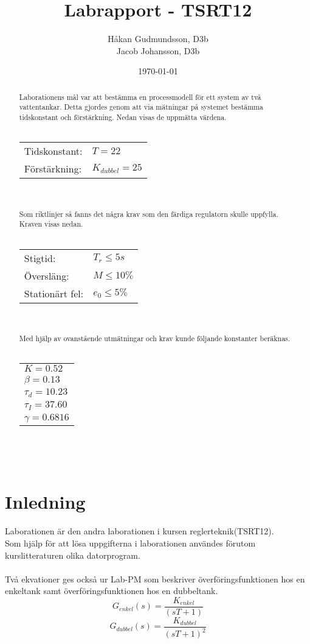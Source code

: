 \documentclass[a4paper]{article}
\title{Labrapport - TSRT12}
\author{Håkan Gudmundsson, D3b \\ Jacob Johansson, D3b}
\date{\today}
\begin{document}
\maketitle
\newpage

\begin{abstract}

Laborationens mål var att bestämma en processmodell för ett system av två vattentankar.
Detta gjordes genom att via mätningar på systemet bestämma tidskonstant och förstärkning.
Nedan visas de uppmätta värdena.
\\\\
\begin{tabular}{l l}
  Tidskonstant: & $T = 22$ \\
  Förstärkning: & $K_{dubbel} = 25$ 
\end{tabular}
\\\\
Som riktlinjer så fanns det några krav som den färdiga regulatorn skulle uppfylla.
Kraven visas nedan.
\\\\
\begin{tabular}{l l}
  Stigtid: & $T_{r} \leq 5s$ \\
  Översläng: & $M \leq 10\%$ \\
  Stationärt fel: & $e_{0} \leq 5\% $ 
\end{tabular}
\\\\
Med hjälp av ovanstående utmätningar och krav kunde följande konstanter beräknas.
\\\\
\begin{tabular}{l}
  $K = 0.52$ \\
  $\beta = 0.13$ \\
  $\tau_{d} = 10.23$ \\
  $\tau_{I} = 37.60$ \\
  $\gamma = 0.6816$ 
\end{tabular}
\\\\
\end{abstract}

\newpage
\tableofcontents
\newpage

\section{Inledning}

Laborationen är den andra laborationen i kursen reglerteknik(TSRT12). \\
Som hjälp för att lösa uppgifterna i laborationen användes förutom kurslitteraturen olika datorprogram. 
\\\\
Två ekvationer ges också ur Lab-PM som beskriver överföringsfunktionen hos en enkeltank samt överföringsfunktionen hos en dubbeltank.
\\
\begin{equation}
  G_{enkel}(s)=\frac{K_{enkel}}{(sT+1)}
\end{equation}
\begin{equation}
  G_{dubbel}(s)=\frac{K_{dubbel}}{(sT+1)^2}
\end{equation}
\end{document}
